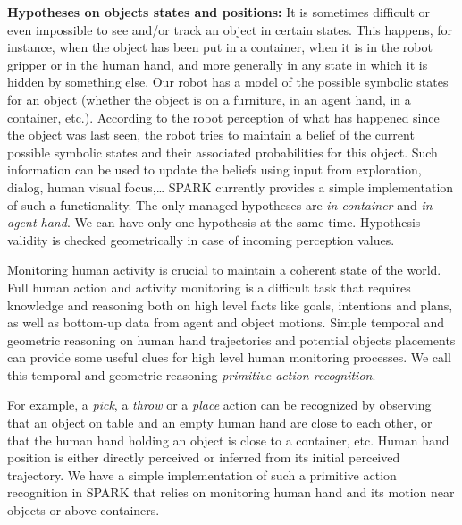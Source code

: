 \documentclass{svmult}
\begin{document}
\vspace{0.3cm}
\noindent
\textbf{Hypotheses on objects states and positions:}
It is sometimes difficult or even impossible to see and/or track an
object in certain states. This happens, for instance, when the object
has been put in a container, when it is in the robot gripper or in the
human hand, and more generally in any state in which it is hidden by
something else. Our robot has a model of the possible symbolic states
for an object (whether the object is on a furniture, in an agent hand,
in a container, etc.).  According to the robot perception of what has
happened since the object was last seen, the robot tries to maintain a
belief of the current possible symbolic states and their associated
probabilities for this object. Such information can be used to update
the beliefs using input from exploration, dialog, human visual
focus,\ldots
SPARK currently provides a simple implementation of such a functionality. The
only managed hypotheses are \emph{in container} and \emph{in agent hand}. We
can have only one hypothesis at the same time. Hypothesis validity is checked
geometrically in case of incoming perception values.


\vspace{0.3cm}
Monitoring human activity is crucial to maintain a coherent state of
the world. Full human action and activity monitoring is a difficult
task that requires knowledge and reasoning both on high level facts
like goals, intentions and plans, as well as bottom-up data from agent
and object motions. Simple temporal and geometric reasoning on human
hand trajectories and potential objects placements can provide some
useful clues for high level human monitoring processes. We call this
temporal and geometric reasoning \emph{primitive action recognition}.

For example, a \emph{pick}, a \emph{throw} or a \emph{place} action
can be recognized by observing that an object on table and an empty
human hand are close to each other, or that the human hand holding an
object is close to a container, etc. Human hand position is either
directly perceived or inferred from its initial perceived trajectory.
We have a simple implementation of such a primitive action recognition
in SPARK that relies on monitoring human hand and its motion near
objects or above containers.
\end{document}
